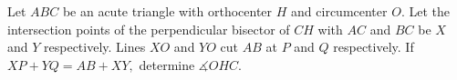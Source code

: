 Let $ABC$ be an acute triangle with orthocenter $H$ and circumcenter $O.$ Let the intersection points of the perpendicular bisector of $CH$ with $AC$ and $BC$ be $X$ and $Y$ respectively. Lines $XO$ and $YO$ cut $AB$ at $P$ and $Q$ respectively.  If $XP+YQ=AB+XY,$ determine $\measuredangle OHC.$